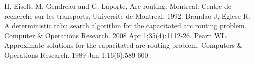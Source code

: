 \documentclass[conference,compsoc]{IEEEtran}
\begin{document}


%
%
\begin{thebibliography}{1}
 H. Eiselt, M. Gendreau and G. Laporte, Arc routing. Montreal: Centre de recherche sur les transports, Universite de Montreal, 1992.
 Brandao J, Eglese R. A deterministic tabu search algorithm for the capacitated arc routing problem. Computer \& Operations Research. 2008 Apr 1;35(4):1112-26.
 Pearn WL. Approximate solutions for the capacitated arc routing problem. Computers \& Operations Research. 1989 Jan 1;16(6):589-600.
\end{thebibliography}





\end{document}
